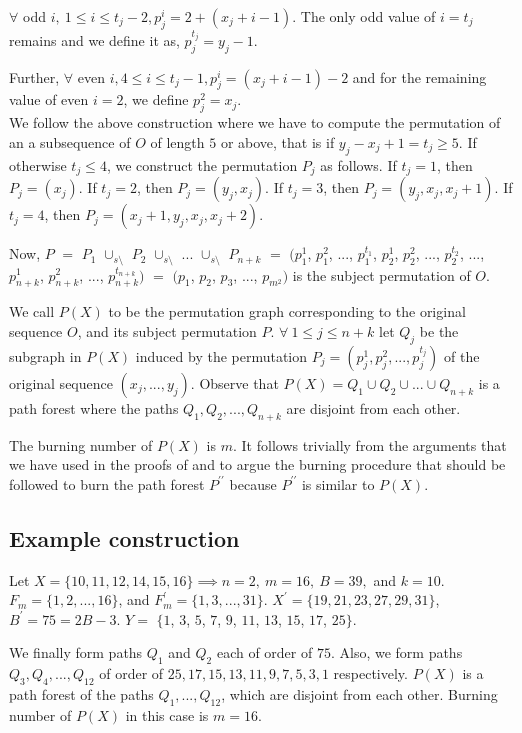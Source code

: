 $\forall$ odd $i,\ 1 \leq i \leq t_j-2, p^i_j = 2+(x_j+i-1)$. The only odd value of $i=t_j$ remains and we define it as,  $p^{t_j}_j = y_j-1$.

Further, $\forall$ even $i, 4 \leq i \leq t_j-1, p^i_j = (x_j+i-1)-2$ and for the remaining value of even $i=2$, we define $p^2_j = x_j$.\\

We follow the above construction where we have to compute the permutation of an a subsequence of $O$ of length $5$ or above, that is if $y_j-x_j+1=t_j\geq 5$. If otherwise $t_j\leq 4$, we construct the permutation $P_j$ as follows. If $t_j=1$, then $P_j=(x_j)$. If $t_j=2$, then $P_j=(y_j,x_j)$. If $t_j=3$, then $P_j=(y_j,x_j,x_j+1)$. If $t_j=4$, then $P_j=(x_j+1,y_j,x_j,x_j+2)$.

Now, $P$ $=$ $P_1$ $\cup_{s\setminus}$ $P_2$ $\cup_{s\setminus}$ $...$ $\cup_{s\setminus}$ $P_{n+k}$ $=$ $(p^1_1$, $p^2_1$, $...$, $p^{t_1}_1$, $p^1_2$, $p^2_2$, $...$, $p^{t_2}_2$, $...$, $p^1_{n+k}$, $p^2_{n+k}$, $...$, $p^{t_{n+k}}_{n+k})$ $=$ $(p_1$, $p_2$, $p_3$, $...$, $p_{m^2})$ is the subject permutation of $O$.

We call $P(X)$ to be the permutation graph corresponding to the original sequence $O$, and its subject permutation $P$. $\forall\ 1\leq j\leq n+k$ let $Q_j$ be the subgraph in $P(X)$ induced by the permutation $P_j=(p^1_j,p^2_j,...,p^{t_j}_j)$ of the original sequence $(x_j,...,y_j)$. Observe that $P(X) = Q_1\cup Q_2\cup...\cup Q_{n+k}$ is a path forest where the paths $Q_1, Q_2,..., Q_{n+k}$ are disjoint from each other.

The burning number of $P(X)$ is $m$. It follows trivially from the arguments that we have used in the proofs of  and  to argue the burning procedure that should be followed to burn the path forest $P^{\prime\prime}$ because $P^{\prime\prime}$ is similar to $P(X)$.

\subsection{Example construction}

Let $X=\{10,11,12,14,15,16\} \implies n=2,\ m = 16,\ B = 39,$ and $k=10$. $F_m=\{1,2,...,16\}$, and $F_m^\prime=\{1,3,...,31\}$. $X^\prime = \{19,21,23,27,29,31\}$, $B^\prime = 75=2B-3$. $Y=$ $\{1$, $3$, $5$, $7$, $9$, $11$, $13$, $15$, $17$, $25\}$.

We finally form paths $Q_1$ and $Q_2$ each of order of $75$. Also, we form paths $Q_3,Q_4,...,Q_{12}$ of order of $25,17,15,13,11,9,7,5,3,1$ respectively. $P(X)$ is a path forest of the paths $Q_1,...,Q_{12}$, which are disjoint from each other. Burning number of $P(X)$ in this case is $m=16$.

